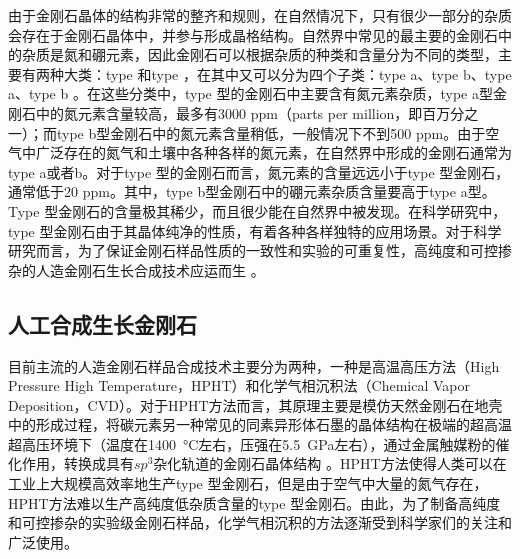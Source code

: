 \documentclass[type = bachelor]{whu-thesis}
\begin{document}
由于金刚石晶体的结构非常的整齐和规则，在自然情况下，只有很少一部分的杂质会存在于金刚石晶体中，并参与形成晶格结构。自然界中常见的最主要的金刚石中的杂质是氮和硼元素，因此金刚石可以根据杂质的种类和含量分为不同的类型，主要有两种大类：type \uppercase\expandafter{}和type \uppercase\expandafter{}，在其中又可以分为四个子类：type \uppercase\expandafter{}a、type \uppercase\expandafter{}b、type \uppercase\expandafter{}a、type \uppercase\expandafter{}b \cite{breeding2009type}。在这些分类中，type \uppercase\expandafter{}型的金刚石中主要含有氮元素杂质，type \uppercase\expandafter{}a型金刚石中的氮元素含量较高，最多有3000 ppm（parts per million，即百万分之一）；而type \uppercase\expandafter{}b型金刚石中的氮元素含量稍低，一般情况下不到500 ppm。由于空气中广泛存在的氮气和土壤中各种各样的氮元素，在自然界中形成的金刚石通常为type \uppercase\expandafter{}a或者\uppercase\expandafter{}b。对于type \uppercase\expandafter{}型的金刚石而言，氮元素的含量远远小于type \uppercase\expandafter{}型金刚石，通常低于20 ppm。其中，type \uppercase\expandafter{}b型金刚石中的硼元素杂质含量要高于type \uppercase\expandafter{}a型。Type \uppercase\expandafter{}型金刚石的含量极其稀少，而且很少能在自然界中被发现。在科学研究中，type \uppercase\expandafter{}型金刚石由于其晶体纯净的性质，有着各种各样独特的应用场景。对于科学研究而言，为了保证金刚石样品性质的一致性和实验的可重复性，高纯度和可控掺杂的人造金刚石生长合成技术应运而生 \cite{sumiya1997crystalline, spitsyn1981vapor, gracio2010diamond}。

\subsection{人工合成生长金刚石}
目前主流的人造金刚石样品合成技术主要分为两种，一种是高温高压方法（High Pressure High Temperature，HPHT）和化学气相沉积法（Chemical Vapor Deposition，CVD）。对于HPHT方法而言，其原理主要是模仿天然金刚石在地壳中的形成过程，将碳元素另一种常见的同素异形体石墨的晶体结构在极端的超高温超高压环境下（温度在\SI{1400}{\degreeCelsius}左右，压强在\SI{5.5}{\GPa}左右），通过金属触媒粉的催化作用，转换成具有$sp^3$杂化轨道的金刚石晶体结构 \cite{dossa2023analysis}。HPHT方法使得人类可以在工业上大规模高效率地生产type \uppercase\expandafter{}型金刚石，但是由于空气中大量的氮气存在，HPHT方法难以生产高纯度低杂质含量的type \uppercase\expandafter{}型金刚石。由此，为了制备高纯度和可控掺杂的实验级金刚石样品，化学气相沉积的方法逐渐受到科学家们的关注和广泛使用。
\end{document}
